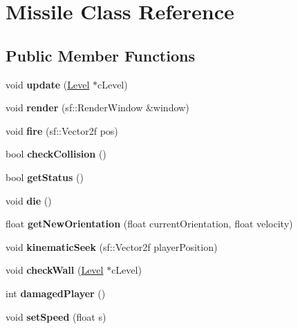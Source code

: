 \hypertarget{class_missile}{}\section{Missile Class Reference}
\label{class_missile}
\subsection*{Public Member Functions}
\begin{DoxyCompactItemize}
\item 
\mbox{\label{class_missile_a2579630767ba1a39870e104d4758185b}} 
void {\bfseries update} (\mbox{\hyperlink{class_level}{Level}} $\ast$c\+Level)
\item 
\mbox{\label{class_missile_a882289a30763d8307727a674655c7367}} 
void {\bfseries render} (sf\+::\+Render\+Window \&window)
\item 
\mbox{\label{class_missile_a31514bcf230dca0d35b2fdb1429faa63}} 
void {\bfseries fire} (sf\+::\+Vector2f pos)
\item 
\mbox{\label{class_missile_af9e2b5c6307be347dfd7bf4a7f180c74}} 
bool {\bfseries check\+Collision} ()
\item 
\mbox{\label{class_missile_a79db5983bd89eeee6cee4c26d82b8590}} 
bool {\bfseries get\+Status} ()
\item 
\mbox{\label{class_missile_a7445546874de0c4eab323a5a3b7735e5}} 
void {\bfseries die} ()
\item 
\mbox{\label{class_missile_ae47648fe82da5832c7d60b3da6276779}} 
float {\bfseries get\+New\+Orientation} (float current\+Orientation, float velocity)
\item 
\mbox{\label{class_missile_ac00042df1e9ee3980b21620b0057df5d}} 
void {\bfseries kinematic\+Seek} (sf\+::\+Vector2f player\+Position)
\item 
\mbox{\label{class_missile_a39109aec345178ed3585189bb7d7746b}} 
void {\bfseries check\+Wall} (\mbox{\hyperlink{class_level}{Level}} $\ast$c\+Level)
\item 
\mbox{\label{class_missile_ab6e683a5b94aa4bfb3262f6a94ce2517}} 
int {\bfseries damaged\+Player} ()
\item 
\mbox{\label{class_missile_a878a1c7465ef494437ad43ad2da9a833}} 
void {\bfseries set\+Speed} (float s)
\end{DoxyCompactItemize}
